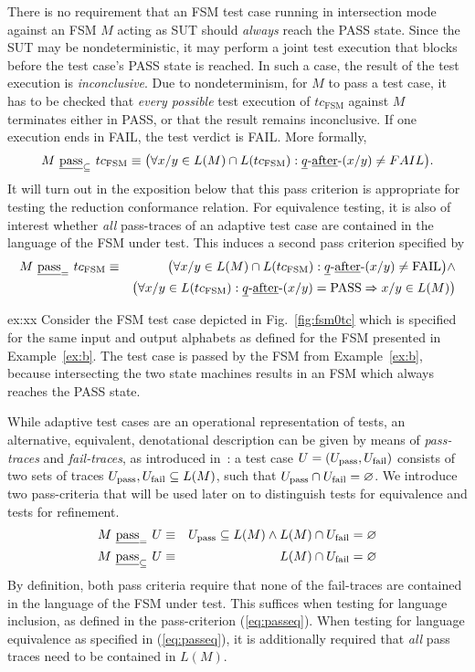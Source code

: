 There is no requirement that an FSM test case running in intersection mode against
an FSM $M$ acting as SUT should {\it always} reach the PASS state. Since the SUT may be nondeterministic, it may perform a joint test execution that blocks before
the test case's PASS state is reached. In such a case, the result of the test execution is \emph{inconclusive}. Due to nondeterminism, for $M$ to pass a test case, it
has to be 
checked that {\it every possible} test execution of  $tc_\text{FSM}$ against $M$
terminates either in PASS, or that the result remains inconclusive. If one execution ends in FAIL, the test verdict is FAIL. More formally,
\[
M\ \underline{\text{pass}}_\subseteq\ tc_\text{FSM} \equiv
\big(
\forall x/y \in L(M)\cap L(tc_\text{FSM}): \underline{q}\text{-\underline{after}-}(x/y) \neq FAIL
\big).
\]
It will turn out in the exposition below that this pass criterion is appropriate for 
testing the reduction conformance relation. For equivalence testing, it is also of 
interest whether {\it all} pass-traces of an adaptive test case are contained
in the language of the FSM under test. This induces a second pass criterion specified by
\begin{eqnarray*}
M\ \underline{\text{pass}}_=\ tc_\text{FSM} & \equiv &
\big(
\forall x/y \in L(M)\cap L(tc_\text{FSM}): \underline{q}\text{-\underline{after}-}(x/y) \neq \text{FAIL}
\big) \wedge
\\ & &
\big(
\forall x/y \in L(tc_\text{FSM}): \underline{q}\text{-\underline{after}-}(x/y) = \text{PASS} \Rightarrow
x/y\in L(M)
\big)
\end{eqnarray*}

\begin{example}{ex:xx}
Consider the FSM test case depicted in Fig.~\ref{fig:fsm0tc} which is specified
for the same input and output alphabets as defined for  the FSM presented in Example~\ref{ex:b}. The test case is passed by the FSM from Example~\ref{ex:b}, because
intersecting the two state machines results in an FSM which always reaches the PASS state.
\end{example}

While adaptive test cases are an operational representation of tests, an alternative, equivalent, denotational description can be given by means of \emph{pass-traces} and \emph{fail-traces}, as introduced in~\cite{huang_peleska_2017sttt}: a test case 
$U = ({U}_\text{pass},{U}_\text{fail})$ consists of two sets of traces 
${U}_\text{pass}, {U}_\text{fail}\subseteq L(M)$, such that ${U}_\text{pass} \cap {U}_\text{fail} = \varnothing$.
We introduce two pass-criteria that will be used later on to distinguish tests for equivalence and tests for refinement.
\begin{eqnarray}
M\ \underline{\text{pass}}_=\ U & \equiv & {U}_\text{pass} \subseteq L(M) \wedge L(M)\cap {U}_\text{fail} =\varnothing
\label{eq:passeq}
\\
M\ \underline{\text{pass}}_\subseteq\ U & \equiv & L(M)\cap {U}_\text{fail} =\varnothing
\label{eq:passred}
\end{eqnarray}
By definition, both pass criteria require that none of the fail-traces are contained
in the language of the FSM under test. This suffices when testing for language inclusion,
as defined in the pass-criterion (\ref{eq:passeq}).
When testing for language equivalence as specified in (\ref{eq:passeq}), it is additionally required that {\it all} pass traces need to be contained in $L(M)$.



